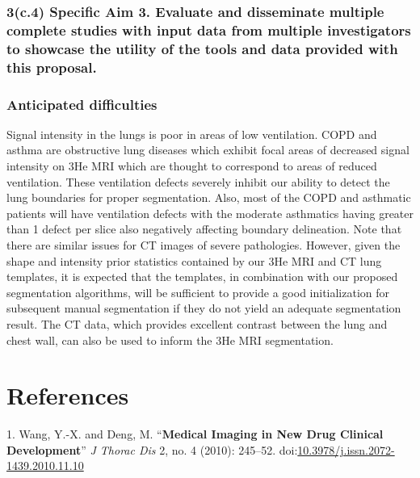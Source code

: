 \documentclass[11pt,]{article}
\begin{document}
\subsubsection{3(c.4) \textbf{Specific Aim 3.} Evaluate and disseminate
multiple complete studies with input data from multiple investigators to
showcase the utility of the tools and data provided with this
proposal.}\label{c.4-specific-aim-3.-evaluate-and-disseminate-multiple-complete-studies-with-input-data-from-multiple-investigators-to-showcase-the-utility-of-the-tools-and-data-provided-with-this-proposal.}

\subsubsection{Anticipated difficulties}\label{anticipated-difficulties}

Signal intensity in the lungs is poor in areas of low ventilation. COPD
and asthma are obstructive lung diseases which exhibit focal areas of
decreased signal intensity on 3He MRI which are thought to correspond to
areas of reduced ventilation. These ventilation defects severely inhibit
our ability to detect the lung boundaries for proper segmentation. Also,
most of the COPD and asthmatic patients will have ventilation defects
with the moderate asthmatics having greater than 1 defect per slice also
negatively affecting boundary delineation. Note that there are similar
issues for CT images of severe pathologies. However, given the shape and
intensity prior statistics contained by our 3He MRI and CT lung
templates, it is expected that the templates, in combination with our
proposed segmentation algorithms, will be sufficient to provide a good
initialization for subsequent manual segmentation if they do not yield
an adequate segmentation result. The CT data, which provides excellent
contrast between the lung and chest wall, can also be used to inform the
3He MRI segmentation.

\clearpage

\newpage

\section*{References}\label{references}

1. Wang, Y.-X. and Deng, M. ``\textbf{Medical Imaging in New Drug
Clinical Development}'' \emph{J Thorac Dis} 2, no. 4 (2010): 245--52.
doi:\href{http://dx.doi.org/10.3978/j.issn.2072-1439.2010.11.10}{10.3978/j.issn.2072-1439.2010.11.10}
\end{document}
